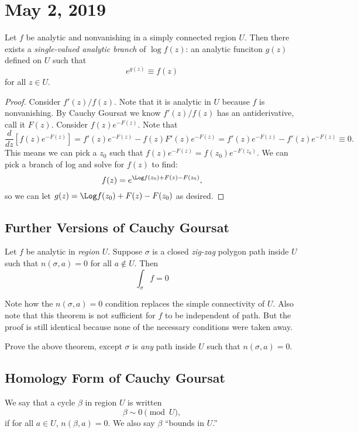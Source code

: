 \section{May 2, 2019}

\begin{theorem}
    Let $f$ be analytic and nonvanishing in a simply connected
    region $U$.
    Then there exists a \textit{single-valued analytic branch} of
    $\log f(z)$:  an analytic funciton $g(z)$ defined
    on $U$ such that 
    \[ e^{g(z)} \equiv f(z) \]
    for all $z \in U$.
\end{theorem}

\begin{proof}
    Consider $f'(z)/f(z)$.
    Note that it is analytic in $U$ because $f$ is nonvanishing.
    By Cauchy Goursat we know $f'(z)/f(z)$ has an antiderivative,
    call it $F(z)$.
    Consider $f(z)e^{-F(z)}$.
    Note that
    \[ \frac{d}{dz} [f(z)e^{-F(z)}] = f'(z)e^{-F(z)} - f(z)F'(z)e^{-F(z)}
    = f'(z)e^{-F(z)} - f'(z) e^{-F(z)} \equiv 0. \]
    This means we can pick a $z_0$ such that $f(z)e^{-F(z)}=
    f(z_0)e^{-F(z_0)}$.
    We can pick a branch of log and solve for $f(z)$ to find:
    \[ f(z) = e^{\Log f(z_0) + F(z) - F(z_0)}, \]
    so we can let $g(z) = \Log f(z_0) + F(z) - F(z_0)$ as
    desired.
\end{proof}

\subsection{Further Versions of Cauchy Goursat}
\begin{theorem}
    Let $f$ be analytic in \textit{region} $U$.
    Suppose $\sigma$ is a closed \textit{zig-zag} polygon path
    inside $U$ such that $n(\sigma, a) = 0$ for all $a \notin U$.
    Then
    \[ \int_{\sigma} f = 0 \]
\end{theorem}

Note how the $n(\sigma, a) = 0$ condition replaces the simple
connectivity of $U$.
Also note that this theorem is not sufficient for $f$ to be
independent of path.
But the proof is still identical because none of the necessary
conditions were taken away.

\begin{exercise}
    Prove the above theorem, except $\sigma$ is \textit{any} path
    inside $U$ such that $n(\sigma, a) = 0$.
\end{exercise}

\subsection{Homology Form of Cauchy Goursat}
\begin{definition}
    We say that a cycle $\beta$ in region $U$ is  written
    \[ \beta \sim 0 \pmod{U}, \]
    if for all $a \in U$, $n(\beta, a) = 0$.
    We also say $\beta$ ``bounds in $U$.''
\end{definition}


